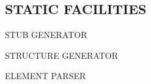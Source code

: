 \begin{bwslide}
\begin{tgrind}
\let\linebox=\relax
\def\_{\ifstring{\char'137}\else\underline{\ }\fi}
\relax
\end{tgrind}
\end{bwslide}


\begin{bwslide}
\begin{tgrind}
\let\linebox=\relax
\def\_{\ifstring{\char'137}\else\underline{\ }\fi}
\relax
\end{tgrind}
\end{bwslide}


\begin{bwslide}
\begin{tgrind}
\let\linebox=\relax
\def\_{\ifstring{\char'137}\else\underline{\ }\fi}
\relax
\end{tgrind}
\end{bwslide}


\begin{bwslide}
\begin{tgrind}\scriptsize
\let\linebox=\relax
\def\_{\ifstring{\char'137}\else\underline{\ }\fi}
\relax
\end{tgrind}
\end{bwslide}


\begin{bwslide}
\begin{tgrind}\scriptsize
\let\linebox=\relax
\def\_{\ifstring{\char'137}\else\underline{\ }\fi}
\relax
\end{tgrind}
\end{bwslide}


\begin{bwslide}
\part	{STATIC FACILITIES}\bf

\begin{nrtc}
\item	STUB GENERATOR

\item	STRUCTURE GENERATOR

\item	ELEMENT PARSER
\end{nrtc}
\end{bwslide}





